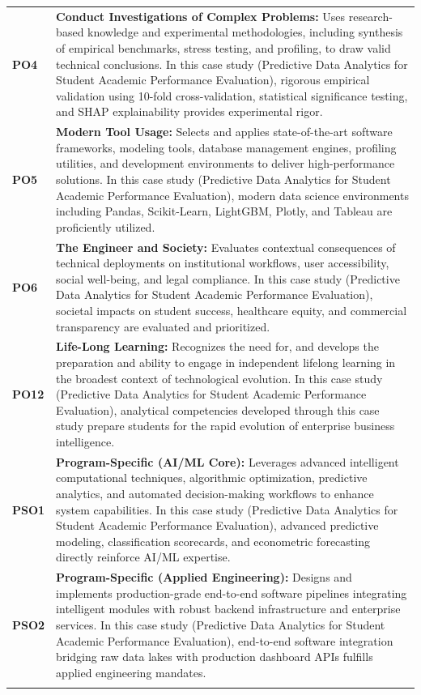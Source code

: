 {\begin{longtable}{@{}>{\centering\arraybackslash}p{1.8cm} p{13.2cm}@{}}
    \addlinespace
\textbf{PO4} & \textbf{Conduct Investigations of Complex Problems:} Uses research-based knowledge and experimental methodologies, including synthesis of empirical benchmarks, stress testing, and profiling, to draw valid technical conclusions. In this case study (Predictive Data Analytics for Student Academic Performance Evaluation), rigorous empirical validation using 10-fold cross-validation, statistical significance testing, and SHAP explainability provides experimental rigor. \\
    \addlinespace
\textbf{PO5} & \textbf{Modern Tool Usage:} Selects and applies state-of-the-art software frameworks, modeling tools, database management engines, profiling utilities, and development environments to deliver high-performance solutions. In this case study (Predictive Data Analytics for Student Academic Performance Evaluation), modern data science environments including Pandas, Scikit-Learn, LightGBM, Plotly, and Tableau are proficiently utilized. \\
    \addlinespace
\textbf{PO6} & \textbf{The Engineer and Society:} Evaluates contextual consequences of technical deployments on institutional workflows, user accessibility, social well-being, and legal compliance. In this case study (Predictive Data Analytics for Student Academic Performance Evaluation), societal impacts on student success, healthcare equity, and commercial transparency are evaluated and prioritized. \\
    \addlinespace
\textbf{PO12} & \textbf{Life-Long Learning:} Recognizes the need for, and develops the preparation and ability to engage in independent lifelong learning in the broadest context of technological evolution. In this case study (Predictive Data Analytics for Student Academic Performance Evaluation), analytical competencies developed through this case study prepare students for the rapid evolution of enterprise business intelligence. \\
    \addlinespace
\textbf{PSO1} & \textbf{Program-Specific (AI/ML Core):} Leverages advanced intelligent computational techniques, algorithmic optimization, predictive analytics, and automated decision-making workflows to enhance system capabilities. In this case study (Predictive Data Analytics for Student Academic Performance Evaluation), advanced predictive modeling, classification scorecards, and econometric forecasting directly reinforce AI/ML expertise. \\
    \addlinespace
\textbf{PSO2} & \textbf{Program-Specific (Applied Engineering):} Designs and implements production-grade end-to-end software pipelines integrating intelligent modules with robust backend infrastructure and enterprise services. In this case study (Predictive Data Analytics for Student Academic Performance Evaluation), end-to-end software integration bridging raw data lakes with production dashboard APIs fulfills applied engineering mandates. \\
    \addlinespace
    \bottomrule
\end{longtable}}